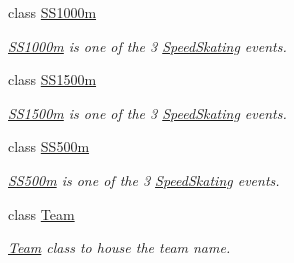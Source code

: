\begin{DoxyCompactItemize}
class \hyperlink{classPCO_1_1SS1000m}{S\+S1000m}
\begin{DoxyCompactList}\small\item\em \hyperlink{classPCO_1_1SS1000m}{S\+S1000m} is one of the 3 \hyperlink{classPCO_1_1SpeedSkating}{Speed\+Skating} events. \end{DoxyCompactList}\item 
class \hyperlink{classPCO_1_1SS1500m}{S\+S1500m}
\begin{DoxyCompactList}\small\item\em \hyperlink{classPCO_1_1SS1500m}{S\+S1500m} is one of the 3 \hyperlink{classPCO_1_1SpeedSkating}{Speed\+Skating} events. \end{DoxyCompactList}\item 
class \hyperlink{classPCO_1_1SS500m}{S\+S500m}
\begin{DoxyCompactList}\small\item\em \hyperlink{classPCO_1_1SS500m}{S\+S500m} is one of the 3 \hyperlink{classPCO_1_1SpeedSkating}{Speed\+Skating} events. \end{DoxyCompactList}\item 
class \hyperlink{classPCO_1_1Team}{Team}
\begin{DoxyCompactList}\small\item\em \hyperlink{classPCO_1_1Team}{Team} class to house the team name. \end{DoxyCompactList}\end{DoxyCompactItemize}
